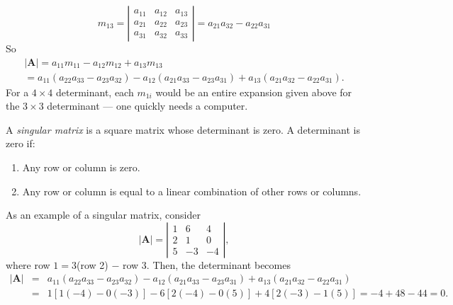 \begin{equation}
m_{13} = \left| \begin{array}{ccc}
a_{11} & a_{12} & a_{13}\\
a_{21} & a_{22} & a_{23}\\
a_{31} & a_{32} & a_{33}
\end{array} \right |
= a_{21}a_{32} - a_{22}a_{31}
\end{equation}
So
\begin{equation}
\begin{array}{c}
|\mathbf{A}| = a_{11}m_{11} - a_{12}m_{12} + a_{13}m_{13}	 \\
= a_{11}(a_{22}a_{33} - a_{23}a_{32}) - a_{12}(a_{21}a_{33} - a_{23}a_{31}) + a_{13}(a_{21}a_{32} - a_{22}a_{31}).
\end{array}
\end{equation}
For a $4 \times 4$ determinant, each $m_{1i}$ would be an entire expansion given above for the 
$3 \times 3$ 
determinant --- one quickly needs a computer.

A \emph{singular matrix} is a square matrix whose determinant is zero. A determinant is zero if:
\begin{enumerate}
\item Any row or column is zero.
\item Any row or column is equal to a linear combination of other rows or columns.
\end{enumerate}
As an example of a singular matrix, consider
\begin{equation}
|{\mathbf A}| = \left | \begin{array}{ccc} 1 & 6 & 4 \\
2 & 1 & 0 \\
5 & -3 & -4 
\end{array} \right |,
\end{equation}
where row $1 = 3$(row 2) $-$ row 3.  Then, the determinant becomes
\begin{equation}
\begin{array}{ccl}
|\mathbf{A}| & = & a_{11}(a_{22}a_{33}-a_{23}a_{32})-a_{12}(a_{21}a_{33}-a_{23}a_{31})+a_{13}(a_{21}a_{32}-a_{22}a_{31})     \\
& = & 1[1(-4)-0(-3)]-6[2(-4)-0(5)]+4[2(-3)-1(5)]=-4+48-44=0.  \\
\end{array}
\end{equation}

